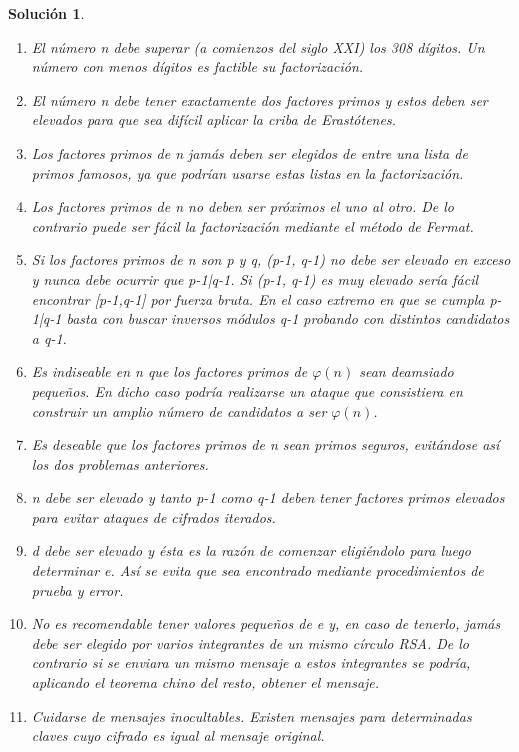 \documentclass[
  a4paper,
  spanish,
  12pt,
]{scrartcl}
\theoremstyle{ejercicio-style}
\theoremstyle{remark-style}
\newtheorem*{sol}{Solución}
\begin{document}
\begin{sol}
  \begin{enumerate}
    \item El número n debe superar (a comienzos del siglo XXI) los 308 dígitos. Un número con menos dígitos es factible su factorización.
    \item El número n debe tener exactamente dos factores primos y estos deben ser elevados para que sea difícil aplicar la criba de Erastótenes.
    \item Los factores primos de n jamás deben ser elegidos de entre una lista de primos famosos, ya que podrían usarse estas listas en la factorización.
    \item Los factores primos de n no deben ser próximos el uno al otro. De lo contrario puede ser fácil la factorización mediante el método de Fermat.
    \item Si los factores primos de n son p y q, (p-1, q-1) no debe ser elevado en exceso y nunca debe ocurrir que p-1|q-1. Si (p-1, q-1) es muy elevado sería fácil encontrar [p-1,q-1] por fuerza bruta. En el caso extremo en que se cumpla p-1|q-1 basta con buscar inversos módulos q-1 probando con distintos candidatos a q-1.
    \item Es indiseable en n que los factores primos de $\varphi(n)$ sean deamsiado pequeños. En dicho caso podría realizarse un ataque que consistiera en construir un amplio número de candidatos a ser $\varphi(n)$.
    \item Es deseable que los factores primos de n sean primos seguros, evitándose así los dos problemas anteriores.
    \item n debe ser elevado y tanto p-1 como q-1 deben tener factores primos elevados para evitar ataques de cifrados iterados.
    \item d debe ser elevado y ésta es la razón de comenzar eligiéndolo para luego determinar e. Así se evita que sea encontrado mediante procedimientos de prueba y error.
    \item No es recomendable tener valores pequeños de e y, en caso de tenerlo, jamás debe ser elegido por varios integrantes de un mismo círculo RSA. De lo contrario si se enviara un mismo mensaje a estos integrantes se podría, aplicando el teorema chino del resto, obtener el mensaje.
    \item Cuidarse de mensajes inocultables. Existen mensajes para determinadas claves cuyo cifrado es igual al mensaje original.

  \end{enumerate}
\end{sol}
\end{document}

